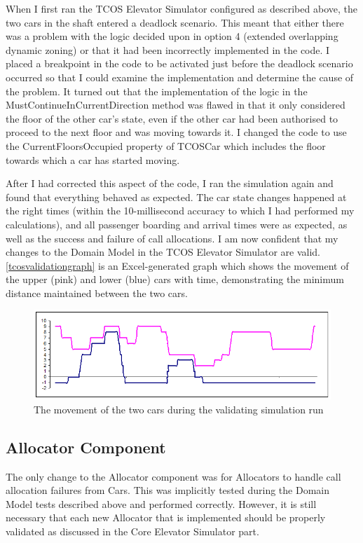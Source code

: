 \documentclass{UoYCSproject}
\begin{document}
When I first ran the TCOS Elevator Simulator configured as described above, the two cars in the shaft entered a deadlock scenario.  This meant that either there was a problem with the logic decided upon in option 4 (extended overlapping dynamic zoning) or that it had been incorrectly implemented in the code.  I placed a breakpoint in the code to be activated just before the deadlock scenario occurred so that I could examine the implementation and determine the cause of the problem.  It turned out that the implementation of the logic in the MustContinueInCurrentDirection method was flawed in that it only considered the floor of the other car's state, even if the other car had been authorised to proceed to the next floor and was moving towards it.  I changed the code to use the CurrentFloorsOccupied property of TCOSCar which includes the floor towards which a car has started moving.

After I had corrected this aspect of the code, I ran the simulation again and found that everything behaved as expected.  The car state changes happened at the right times (within the 10-millisecond accuracy to which I had performed my calculations), and all passenger boarding and arrival times were as expected, as well as the success and failure of call allocations.  I am now confident that my changes to the Domain Model in the TCOS Elevator Simulator are valid.  \autoref{tcosvalidationgraph} is an Excel-generated graph which shows the movement of the upper (pink) and lower (blue) cars with time, demonstrating the minimum distance maintained between the two cars.

\begin{figure} [h]
	\centering
	\includegraphics[width=\linewidth,keepaspectratio]{tcos_validation_movement_graph.png}
	\caption{The movement of the two cars during the validating simulation run}
	\label{tcosvalidationgraph}
\end{figure}

\subsection{Allocator Component}
The only change to the Allocator component was for Allocators to handle call allocation failures from Cars.  This was implicitly tested during the Domain Model tests described above and performed correctly.  However, it is still necessary that each new Allocator that is implemented should be properly validated as discussed in the Core Elevator Simulator part.
\end{document}
